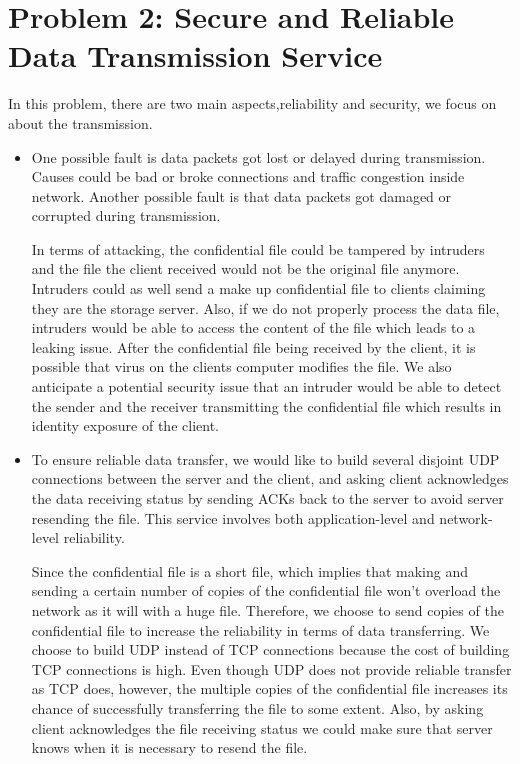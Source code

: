 \section{Problem 2: Secure and Reliable Data Transmission Service}

In this problem, there are two main aspects,reliability and security, we focus on about the transmission.

\begin{itemize}

\item One possible fault is data packets got lost or delayed during transmission. Causes could be bad or broke connections and traffic congestion inside network. Another possible fault is that data packets got damaged or corrupted during transmission.

In terms of attacking, the confidential file could be tampered by intruders and the file the client received would not be the original file anymore. Intruders could as well send a make up confidential file to clients claiming they are the storage server. Also, if we do not properly process the data file, intruders would be able to access the content of the file which leads to a  leaking issue. After the confidential file being received by the client, it is possible that virus on the clients computer modifies the file. We also anticipate a potential security issue that an intruder would be able to detect the sender and the receiver transmitting the confidential file which results in identity exposure of the client.

\item To ensure reliable data transfer, we would like to build several disjoint UDP connections between the server and the client, and asking client acknowledges the data receiving status by sending ACKs back to the server to avoid server resending the file. This service involves both application-level and network-level reliability.

Since the confidential file is a short file, which implies that making and sending a certain number of copies of the confidential file won't overload the network as it will with a huge file. Therefore, we choose to send copies of the confidential file to increase the reliability in terms of data transferring. We choose to build UDP instead of TCP connections because the cost of building TCP connections is high. Even though UDP does not provide reliable transfer as TCP does, however, the multiple copies of the confidential file increases its chance of successfully transferring the file to some extent. Also, by asking client acknowledges the file receiving status we could make sure that server knows when it is necessary to resend the file.


\end{itemize}
